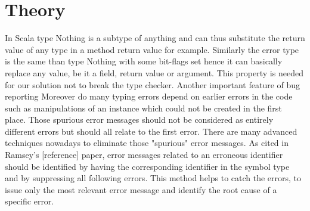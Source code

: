 \section{Theory}

In Scala type {\ttfamily Nothing} is a subtype of anything and can thus substitute the return value of any type in a method return value for example.
Similarly the error type is the same than type {\ttfamily Nothing} with some bit-flags set hence it can basically replace any value, be it a field, return value or argument. This property is needed for our solution not to break the type checker.
Another important feature of bug reporting
Moreover do many typing errors depend on earlier errors in the code such as manipulations of an instance which could not be created in the first place. Those spurious error messages should not be considered as entirely different errors but should all relate to the first error. There are many advanced techniques nowadays to eliminate those "spurious" error messages. As cited in Ramsey's [reference] paper, error messages related to an erroneous identifier should be identified by having the corresponding identifier in the symbol type and by suppressing all following errors. This method helps to catch the errors, to issue only the most relevant error message and identify the root cause of a specific error.